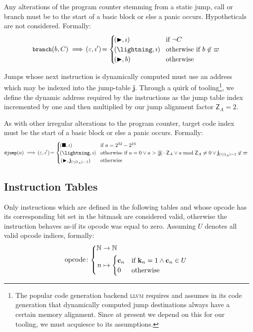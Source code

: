 Any alterations of the program counter stemming from a static jump, call or branch must be to the start of a basic block or else a panic occurs. Hypotheticals are not considered. Formally:
\begin{equation}
  \token{branch}(b, C) \implies \tup{\varepsilon, \imath'} = \begin{cases}
    \tup{\continue, \imath} &\when \lnot C \\
    \tup{\panic, \imath} &\otherwhen b \not\in \basicblocks \\
    \tup{\continue, b} &\otherwise
  \end{cases}
\end{equation}

Jumps whose next instruction is dynamically computed must use an address which may be indexed into the jump-table $\mathbf{j}$. Through a quirk of tooling\footnote{The popular code generation backend \textsc{llvm} requires and assumes in its code generation that dynamically computed jump destinations always have a certain memory alignment. Since at present we depend on this for our tooling, we must acquiesce to its assumptions.}, we define the dynamic address required by the instructions as the jump table index incremented by one and then multiplied by our jump alignment factor $\mathsf{Z}_A = 2$.

As with other irregular alterations to the program counter, target code index must be the start of a basic block or else a panic occurs. Formally:
\begin{equation}\label{eq:jumptablealignment}
  \token{djump}(a) \implies \tup{\varepsilon, \imath'} = \begin{cases}
    \tup{\halt, \imath} &\when a = 2^{32} - 2^{16}\\
    \tup{\panic, \imath} &\otherwhen a = 0 \vee a > \len{\mathbf{j}}\cdot\mathsf{Z}_A \vee a \bmod \mathsf{Z}_A \ne 0 \vee \mathbf{j}_{(\nicefrac{a}{\mathsf{Z}_A}) - 1} \not\in \basicblocks \\
    (\continue, \mathbf{j}_{(\nicefrac{a}{\mathsf{Z}_A}) - 1}) &\otherwise
  \end{cases}
\end{equation}

\subsection{Instruction Tables}\label{sec:instructiontables}

Only instructions which are defined in the following tables and whose opcode has its corresponding bit set in the bitmask are considered valid, otherwise the instruction behaves as-if its opcode was equal to zero. Assuming $U$ denotes all valid opcode indices, formally:
\begin{equation}
  \text{opcode}\colon\abracegroup{
    \N &\to \N\\
    n &\mapsto \begin{cases}
    \mathbf{c}\sub{n} &\when \mathbf{k}\sub{n} = 1 \wedge \mathbf{c}\sub{n} \in U \\
    0 &\otherwise
    \end{cases}
  }
\end{equation}

